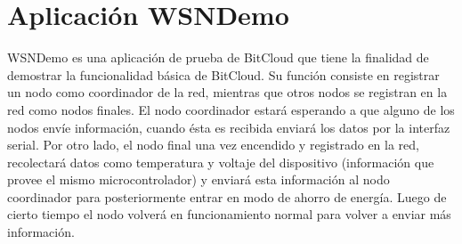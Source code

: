 \appendix

\chapter{Aplicaci\'on WSNDemo}

WSNDemo es una aplicaci\'on de prueba de BitCloud que tiene la finalidad de demostrar la funcionalidad b\'asica de BitCloud. Su funci\'on consiste en registrar un nodo como coordinador de la red, mientras que otros nodos se registran en la red como nodos finales. El nodo coordinador estar\'a esperando a que alguno de los nodos env\'ie informaci\'on, cuando \'esta es recibida enviar\'a los datos por la interfaz serial. 
Por otro lado, el nodo final una vez encendido y registrado en la red, recolectar\'a datos como temperatura y voltaje del dispositivo (informaci\'on que provee el mismo microcontrolador) y enviar\'a esta informaci\'on al nodo coordinador para posteriormente entrar en modo de ahorro de energ\'ia. Luego de cierto tiempo el nodo volver\'a en funcionamiento normal para volver a enviar m\'as informaci\'on. 
